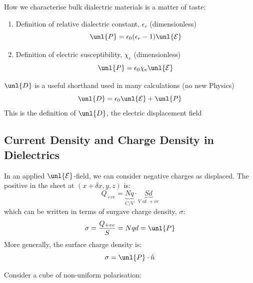 \documentclass[a4paper, 11pt, normalem]{report}
\newcommand\E{\mathcal{E}}
\newcommand\uE{\unl{\E}}
\newcommand\eno{\epsilon_0}
\newcommand\hn{\hat{n}}
\newcommand\er{\epsilon_r}
\begin{document}
How we characterise bulk dialectric materials is a matter of taste:
\begin{enumerate}
    \item Definition of relative dialectric constant, $\er$ (dimensionless)
    \begin{equation}
        \unl{P} = \eno(\er - 1)\uE
    \end{equation}
    \item Definition of electric susceptibility, $\chi_e$ (dimensionless)
    \begin{equation}
        \unl{P} = \eno\chi_e\uE
    \end{equation}
\end{enumerate}
$\unl{D}$ is a useful shorthand used in many calculations (no new Physics)
\begin{equation}
    \unl{D} = \eno\uE + \unl{P}
\end{equation}
This is the definition of $\unl{D}$, the electric displacement field

\subsection{Current Density and Charge Density in Dielectrics}
In an applied $\uE$-field, we can consider negative charges as displaced.
The positive in the sheet at $(x+\delta x, y, z)$ is:
\begin{equation}
    Q_{+ve} = \underbrace{Nq}_{C/V} \cdot \underbrace{Sd}_{V \text{ of }+ve}
\end{equation}
which can be written in terms of surgave charge density, $\sigma$:
\begin{equation}
    \sigma = \frac{Q_{+ve}}{S} = Nqd = \unl{P}
\end{equation}
More generally, the surface charge density is:
\begin{equation}
    \sigma = \unl{P}\cdot\hn
\end{equation}

Consider a cube of non-uniform polarisation:
\end{document}
